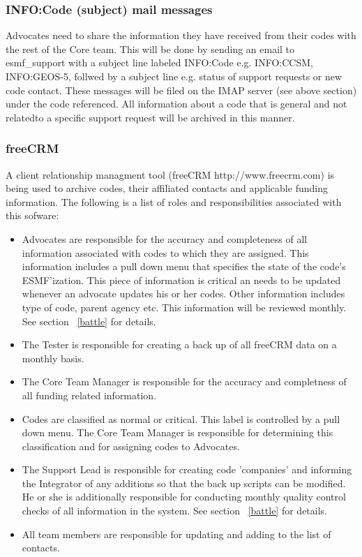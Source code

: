 \subsubsection{INFO:Code (subject) mail messages}
\label{infomail}
Advocates need to share the information they have received from their codes with the rest of the Core team. This will be done by sending an email to esmf\_support with a subject line labeled INFO:Code e.g. INFO:CCSM, INFO:GEOS-5, follwed by a subject line e.g. status of support requests or new code contact.  These messages will be filed on the IMAP server (see above section) under the code referenced. All information about a code that is general and not relatedto a specific support request will be archived in this manner. 

\subsubsection{freeCRM}
A client relationship managment tool (freeCRM http://www.freecrm.com) is being used to archive codes, their affiliated contacts and applicable funding information. The following is a list of roles and responsibilities associated with this sofware:
\begin{itemize}
\item Advocates are responsible for the accuracy and completeness of all information associated with codes to which they are assigned.  This information includes a pull down menu that specifies the state of the code's ESMF'ization. This piece of information is critical an needs to be updated whenever an advocate updates his or her codes. Other information includes type of code, parent agency etc. This information will be reviewed monthly. See section ~\ref{battle} for details.
\item The Tester is responsible for creating a back up of all freeCRM data on a monthly basis.
\item The Core Team Manager is responsible for the accuracy and completness of all funding related information.
\item Codes are classified as normal or critical. This label is controlled by a pull down menu. The Core Team Manager is responsible for determining this classification and for assigning codes to Advocates.
\item The Support Lead is responsible for creating code 'companies' and informing the Integrator of any additions so that the back up scripts can be modified. He or she is additionally responsible for conducting monthly quality control checks of all information in the system. See section ~\ref{battle} for details.
\item All team members are responsible for updating and adding to the list of contacts. 
\end{itemize} 

